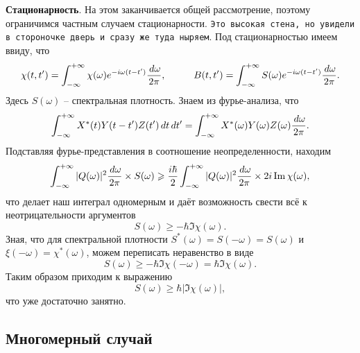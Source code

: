 \textbf{Стационарность}. 
 На этом заканчивается общей рассмотрение, поэтому ограничимся частным случаем стационарности. \texttt{Это высокая стена, но увидели в стороночке дверь и сразу же туда ныряем}. Под стационарностью имеем ввиду, что
\begin{equation*}
 	\chi(t, t') = \int_{-\infty}^{+\infty} \chi(\omega) e^{- i \omega(t-t')} \frac{\d \omega}{2\pi},
 	\hspace{10 mm} 
 	B(t, t')= \int_{-\infty}^{+\infty} S(\omega) e^{- i \omega (t-t')} \frac{\d \omega }{2\pi}.
\end{equation*}
Здесь $S(\omega)$ -- спектральная плотность.
Знаем из фурье-анализа, что
\begin{equation*}
	\int_{-\infty}^{+\infty} X^*(t) Y(t-t') Z(t') \, d t \, d t' = \int_{-\infty}^{+\infty} X^*(\omega) Y(\omega) Z(\omega) \frac{\, d \omega}{2\pi}.
\end{equation*}
Подставляя фурье-представления в соотношение неопределенности, находим
\begin{equation*}
	\int_{-\infty}^{+\infty} |Q(\omega)|^2  \frac{\, d \omega}{2\pi} \times  S(\omega) \geqslant \frac{i \hbar}{2} \int_{-\infty}^{+\infty} |Q(\omega)|^2 \frac{\, d \omega}{2\pi} \times 2 i \mathop{\mathrm{Im}}\nolimits \chi(\omega),
\end{equation*}
что делает наш интеграл одномерным и даёт возможность свести всё к неотрицательности аргументов
\begin{equation*}
	S(\omega) \geq - \hbar \Im \chi(\omega).
\end{equation*}
Зная, что для спектральной плотности $S^*(\omega) = S(-\omega) = S(\omega)$ и $\xi(-\omega) = \chi^*(\omega)$, можем переписать неравенство в виде
\begin{equation*}
	S(\omega) \geq - \hbar \Im \chi(-\omega) = \hbar \Im \chi(\omega).
\end{equation*}
Таким образом приходим к выражению 
\begin{equation}
	S(\omega) \geq \hbar |\Im \chi(\omega)|,
\end{equation}
что уже достаточно занятно. 





\subsection{Многомерный случай}


